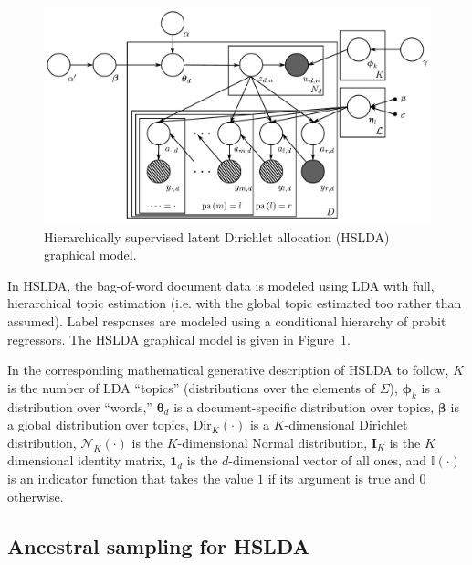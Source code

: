 %
\begin{figure}[t]
 \centering \includegraphics[scale=0.4]{Chapters/chapter1/Graphical_Model-final} \caption{Hierarchically supervised latent Dirichlet allocation (HSLDA) graphical model.}


\label{fig:graphical_model} 
\end{figure}

In HSLDA, the bag-of-word document data is modeled using LDA with
 full, hierarchical topic estimation (i.e. with the global topic estimated too rather than assumed).
Label responses are modeled using a conditional
hierarchy of probit regressors. The HSLDA graphical model is given in
Figure~\ref{fig:graphical_model}.

 In the corresponding mathematical generative description of HSLDA to follow, $K$ is the number of LDA
``topics'' (distributions over the elements of $\Sigma$), $\boldsymbol\phi_k$
is a distribution over ``words,'' $\boldsymbol\theta_d$ is a document-specific
distribution over topics, $\boldsymbol\beta$ is a global distribution over
topics, Dir$_{K}(\cdot)$ is a $K$-dimensional Dirichlet distribution,
$\mathcal{N}_{K}(\cdot)$ is the $K$-dimensional Normal distribution,
$\mathbf{I}_{K}$ is the $K$ dimensional identity matrix,  $\mathbf{1}_d$ is the
$d$-dimensional vector of all ones, and $\mathbb{I}(\cdot)$ is an indicator
function that takes the value $1$ if its argument is true and $0$ otherwise.

\subsection{Ancestral sampling for HSLDA}

